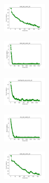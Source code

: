 \begin{figure}[H]
    \begin{subfigure}
        \centering
        \includegraphics[width=0.234\textwidth]{img/am10/ecoli_set_const_10_589741062_cost.png}
    \end{subfigure}
    \hfill
    \begin{subfigure}
        \centering
        \includegraphics[width=0.234\textwidth]{img/am10/rand_set_const_10_589741062_cost.png}
    \end{subfigure}
    \hfill
    \begin{subfigure}
        \centering
        \includegraphics[width=0.234\textwidth]{img/am10/newthyroid_set_const_10_589741062_cost.png}
    \end{subfigure}
    \hfill
    \begin{subfigure}
        \centering
        \includegraphics[width=0.234\textwidth]{img/am10/iris_set_const_10_277451237_cost.png}
    \end{subfigure}
    \hfill
    \begin{subfigure}
        \centering
        \includegraphics[width=0.234\textwidth]{img/am10/ecoli_set_const_10_277451237_cost.png}
    \end{subfigure}
    \hfill
    \begin{subfigure}
        \centering

\end{subfigure}
\end{figure}
